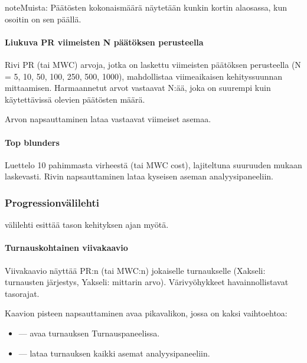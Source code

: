 \documentclass[letterpaper,10pt,finnish]{sphinxmanual}
\begin{document}
\begin{sphinxadmonition}{note}{Muista:}
\sphinxAtStartPar
Päätösten kokonaismäärä näytetään kunkin kortin alaosassa, kun osoitin on sen päällä.
\end{sphinxadmonition}


\paragraph{Liukuva PR viimeisten N päätöksen perusteella}
\label{\detokenize{manuel:pr-glissant-sur-n-dernieres-decisions}}
\sphinxAtStartPar
Rivi PR\sphinxhyphen{} (tai MWC\sphinxhyphen{}) arvoja, jotka on laskettu viimeisten  päätöksen perusteella (N = 5, 10, 50, 100, 250, 500, 1000), mahdollistaa viimeaikaisen kehityssuunnan mittaamisen. Harmaannetut arvot vastaavat N:ää, joka on suurempi kuin käytettävissä olevien päätösten määrä.

\sphinxAtStartPar
Arvon napsauttaminen lataa vastaavat viimeiset  asemaa.


\paragraph{Top blunders}
\label{\detokenize{manuel:top-blunders}}
\sphinxAtStartPar
Luettelo 10 pahimmasta virheestä (tai MWC cost), lajiteltuna suuruuden mukaan laskevasti. Rivin napsauttaminen lataa kyseisen aseman analyysipaneeliin.


\subsubsection{Progression\sphinxhyphen{}välilehti}
\label{\detokenize{manuel:onglet-progression}}
\sphinxAtStartPar
{}\sphinxhyphen{}välilehti esittää tason kehityksen ajan myötä.


\paragraph{Turnauskohtainen viivakaavio}
\label{\detokenize{manuel:courbe-par-tournoi}}
\sphinxAtStartPar
Viivakaavio näyttää PR:n (tai MWC:n) jokaiselle turnaukselle (X\sphinxhyphen{}akseli: turnausten järjestys, Y\sphinxhyphen{}akseli: mittarin arvo). Värivyöhykkeet havainnollistavat tasorajat.

\sphinxAtStartPar
Kaavion pisteen napsauttaminen avaa pikavalikon, jossa on kaksi vaihtoehtoa:
\begin{itemize}
\item {} 
\sphinxAtStartPar
{} — avaa turnauksen Turnauspaneelissa.

\item {} 
\sphinxAtStartPar
{} — lataa turnauksen kaikki asemat analyysipaneeliin.

\end{itemize}
\end{document}
